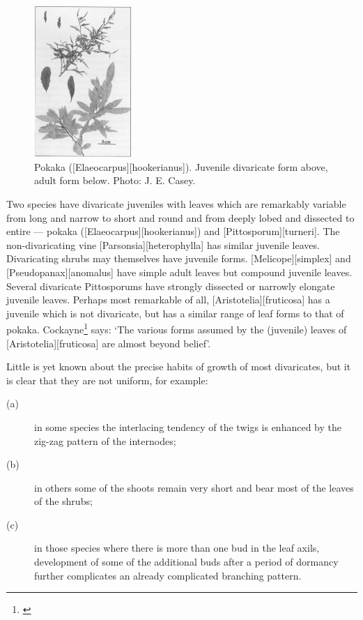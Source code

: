\begin{figure}
	\includegraphics[width=0.33\textwidth]{graphics/figure78pokaka.jpg}
	\centering
	\caption[Pokaka]{Pokaka ([Elaeocarpus][hookerianus]).
	Juvenile divaricate form above, adult form below.
	Photo:  J. E. Casey.}%
	\label{fig:78pokaka}
\end{figure}

Two species have divaricate juveniles with leaves which are remarkably variable from long and narrow to short and round and from deeply lobed and dissected to entire --- pokaka ([Elaeocarpus][hookerianus]) and [Pittosporum][turneri].
The non-divaricating vine [Parsonsia][heterophylla] has similar juvenile leaves.
Divaricating shrubs may themselves have juvenile forms. [Melicope][simplex] and [Pseudopanax][anomalus] have simple adult leaves but compound juvenile leaves.
Several divaricate Pittosporums have strongly dissected or narrowly elongate juvenile leaves.
Perhaps most remarkable of all, [Aristotelia][fruticosa] has a juvenile which is not divaricate, but has a similar range of leaf forms to that of pokaka.
Cockayne\footnote{\cite{cockayne1899enquiry}} says: `The various forms assumed by the (juvenile) leaves of [Aristotelia][fruticosa] are almost beyond belief'.

Little is yet known about the precise habits of growth of most divaricates, but it is clear that they are not uniform, for example: \begin{description}
\item[{(a)}]in some species the interlacing tendency of the twigs is enhanced by the zig-zag pattern of the internodes;
\item[{(b)}]in others some of the shoots remain very short and bear most of the leaves of the shrubs;
\item[{(c)}]in those species where there is more than one bud in the leaf axils, development of some of the additional buds after a period of dormancy further complicates an already complicated branching pattern.
\end{description}


